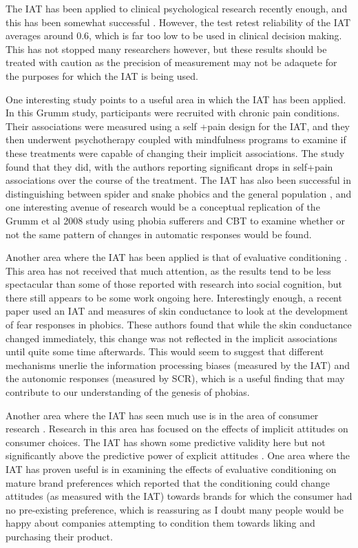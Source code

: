 The IAT has been applied to clinical psychological research recently enough, and this has been somewhat successful \cite{DeHouwer2002}. However, the test retest reliability of the IAT averages around 0.6, which is far too low to be used in clinical decision making. This has not stopped many researchers however, but these results should be treated with caution as the precision of measurement may not be adaquete for the purposes for which the IAT is being used. 

One interesting study \cite{Grumm2008} points to a useful area in which the IAT has been applied. In this Grumm study, participants were recruited with chronic pain conditions. Their associations were measured using a self +pain design for the IAT, and they then underwent psychotherapy coupled with mindfulness programs to examine if these treatments were capable of changing their implicit associations. The study found that they did, with the authors reporting significant drops in self+pain associations over the course of the treatment. The IAT has also been successful in distinguishing between spider and snake phobics and the general population \cite{Egloff2002,Lane2007}  , and one interesting avenue of research would be a conceptual replication of the Grumm et al 2008 study using phobia sufferers and CBT to examine whether or not the same pattern of changes in automatic responses would be found. 

Another area where the IAT has been applied is that of evaluative conditioning \cite{Mitchell2003}. This area has not received that much attention, as the results tend to be less spectacular than some of those reported with research into social cognition, but there still appears to be some work ongoing here. Interestingly enough, a recent paper \cite{Boschen2007} used an IAT and measures of skin conductance to look at the development of fear responses in phobics. These authors found that while the skin conductance changed immediately, this change was not reflected in the implicit associations until quite some time afterwards. This would seem to suggest that different mechanisms unerlie the information processing biases (measured by the IAT) and the autonomic responses (measured by SCR), which is a useful finding that may contribute to our understanding of the genesis of phobias. 

Another area where the IAT has seen much use is in the area of consumer research \cite{Lane2007,Maison2001}. Research in this area has focused on the effects of implicit attitudes on consumer choices. The IAT has shown some predictive validity here \cite{Maison2004}  but not significantly above the predictive power of explicit attitudes \cite{Greenwald2009}. One area where the IAT has proven useful is in examining the effects of evaluative conditioning on mature brand preferences \cite{Gibson2008} which reported that the conditioning could change attitudes (as measured with the IAT) towards brands for which the consumer had no pre-existing preference, which is reassuring as I doubt many people would be happy about companies attempting to condition them towards liking and purchasing their product. 

